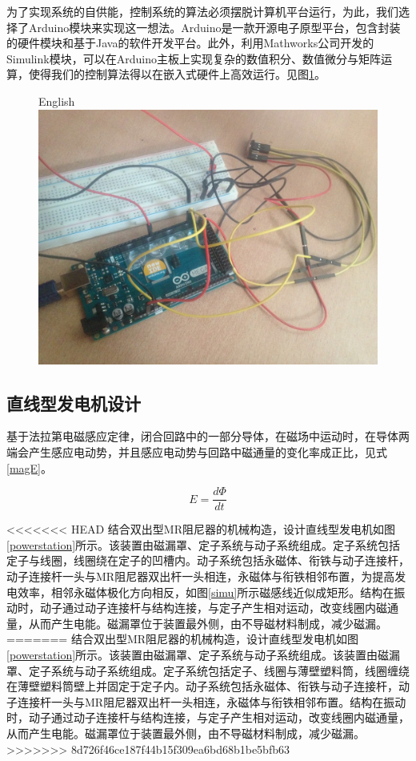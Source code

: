 为了实现系统的自供能，控制系统的算法必须摆脱计算机平台运行，为此，我们选择了Arduino模块来实现这一想法。Arduino是一款开源电子原型平台，包含封装的硬件模块和基于Java的软件开发平台。此外，利用Mathworks公司开发的Simulink模块，可以在Arduino主板上实现复杂的数值积分、数值微分与矩阵运算，使得我们的控制算法得以在嵌入式硬件上高效运行。见图\ref{arduino}。

\begin{figure}[H]
	\centering
		{English}
	\label{arduino}
	\includegraphics[width=.5\linewidth]{figure/arduino}
\end{figure}




\subsection{直线型发电机设计}
基于法拉第电磁感应定律，闭合回路中的一部分导体，在磁场中运动时，在导体两端会产生感应电动势，并且感应电动势与回路中磁通量的变化率成正比\cite{elliott1993}，见式\eqref{magE}。

\begin{equation}
\label{magE}
E=\frac{d\Phi}{dt}
\end{equation}

<<<<<<< HEAD
结合双出型MR阻尼器的机械构造，设计直线型发电机如图\ref{powerstation}所示。该装置由磁漏罩、定子系统与动子系统组成。定子系统包括定子与线圈，线圈绕在定子的凹槽内。动子系统包括永磁体、衔铁与动子连接杆，动子连接杆一头与MR阻尼器双出杆一头相连，永磁体与衔铁相邻布置，为提高发电效率，相邻永磁体极化方向相反，如图\ref{simu}所示磁感线近似成矩形。结构在振动时，动子通过动子连接杆与结构连接，与定子产生相对运动，改变线圈内磁通量，从而产生电能。磁漏罩位于装置最外侧，由不导磁材料制成，减少磁漏。
=======
结合双出型MR阻尼器的机械构造，设计直线型发电机如图\ref{powerstation}所示。该装置由磁漏罩、定子系统与动子系统组成。该装置由磁漏罩、定子系统与动子系统组成。定子系统包括定子、线圈与薄壁塑料筒，线圈缠绕在薄壁塑料筒壁上并固定于定子内。动子系统包括永磁体、衔铁与动子连接杆，动子连接杆一头与MR阻尼器双出杆一头相连，永磁体与衔铁相邻布置。结构在振动时，动子通过动子连接杆与结构连接，与定子产生相对运动，改变线圈内磁通量，从而产生电能。磁漏罩位于装置最外侧，由不导磁材料制成，减少磁漏。
>>>>>>> 8d726f46ce187f44b15f309ea6bd68b1be5bfb63

